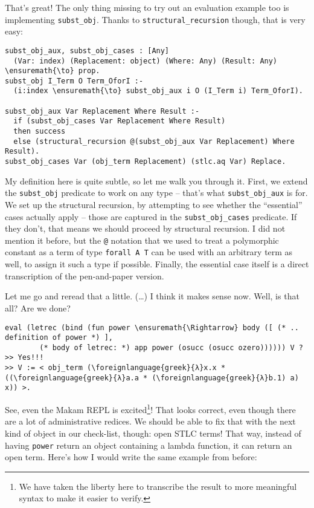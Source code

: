 \heroADVISOR{} That's great! The only thing missing to try out an evaluation
example too is implementing \texttt{subst\_obj}. Thanks to
\texttt{structural\_recursion} though, that is very easy:

\begin{verbatim}
subst_obj_aux, subst_obj_cases : [Any]
  (Var: index) (Replacement: object) (Where: Any) (Result: Any) \ensuremath{\to} prop.
subst_obj I_Term O Term_OforI :-
  (i:index \ensuremath{\to} subst_obj_aux i O (I_Term i) Term_OforI).

subst_obj_aux Var Replacement Where Result :-
  if (subst_obj_cases Var Replacement Where Result)
  then success
  else (structural_recursion @(subst_obj_aux Var Replacement) Where Result).
subst_obj_cases Var (obj_term Replacement) (stlc.aq Var) Replace.
\end{verbatim}

\noindent
My definition here is quite subtle, so let me walk you through it.
First, we extend the \texttt{subst\_obj} predicate to work on any type
-- that's what \texttt{subst\_obj\_aux} is for. We set up the structural
recursion, by attempting to see whether the ``essential'' cases actually
apply -- those are captured in the \texttt{subst\_obj\_cases} predicate.
If they don't, that means we should proceed by structural recursion. I
did not mention it before, but the \texttt{@} notation that we used to
treat a polymorphic constant as a term of type \texttt{forall\ A\ T} can
be used with an arbitrary term as well, to assign it such a type if
possible. Finally, the essential case itself is a direct transcription
of the pen-and-paper version.

\heroSTUDENT{} Let me go and reread that a little. (\ldots{}) I think it makes
sense now. Well, is that all? Are we done?

\begin{verbatim}
eval (letrec (bind (fun power \ensuremath{\Rightarrow} body ([ (* .. definition of power *) ],
        (* body of letrec: *) app power (osucc (osucc ozero)))))) V ?
>> Yes!!!
>> V := < obj_term (\foreignlanguage{greek}{λ}x.x * ((\foreignlanguage{greek}{λ}a.a * (\foreignlanguage{greek}{λ}b.1) a) x)) >.
\end{verbatim}

\heroADVISOR{} See, even the Makam REPL is
excited\footnote{We have taken the liberty here to transcribe the result to more meaningful syntax to make it easier to verify.}!
That looks correct, even though there are a lot of administrative
redices. We should be able to fix that with the next kind of object in
our check-list, though: open STLC terms! That way, instead of having
\texttt{power} return an object containing a lambda function, it can
return an open term. Here's how I would write the same example from
before:

